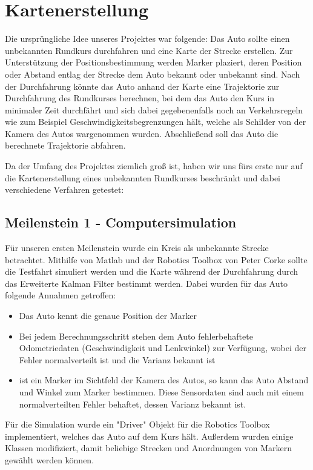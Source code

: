 \section{Kartenerstellung}

Die ursprüngliche Idee unseres Projektes war folgende: Das Auto sollte einen unbekannten Rundkurs durchfahren und eine Karte der Strecke erstellen. Zur Unterstützung der Positionsbestimmung werden Marker plaziert, deren Position oder Abstand entlag der Strecke dem Auto bekannt oder unbekannt sind.
Nach der Durchfahrung könnte das Auto anhand der Karte eine Trajektorie zur Durchfahrung des Rundkurses berechnen, bei dem das Auto den Kurs in minimaler Zeit durchfährt und sich dabei gegebenenfalls noch an Verkehrsregeln wie zum Beispiel Geschwindigkeitsbegrenzungen hält, welche als Schilder von der Kamera des Autos wargenommen wurden.
Abschließend soll das Auto die berechnete Trajektorie abfahren.

Da der Umfang des Projektes ziemlich groß ist, haben wir uns fürs erste nur auf die Kartenerstellung eines unbekannten Rundkurses beschränkt und dabei verschiedene Verfahren getestet:

\subsection{Meilenstein 1 - Computersimulation}

Für unseren ersten Meilenstein wurde ein Kreis als unbekannte Strecke betrachtet. Mithilfe von Matlab und der Robotics Toolbox von Peter Corke sollte die Testfahrt simuliert werden und die Karte während der Durchfahrung durch das Erweiterte Kalman Filter bestimmt werden.
Dabei wurden für das Auto folgende Annahmen getroffen:
\begin{itemize}
 	\item Das Auto kennt die genaue Position der Marker
 	\item Bei jedem Berechnungsschritt stehen dem Auto fehlerbehaftete Odometriedaten (Geschwindigkeit und Lenkwinkel) zur Verfügung, wobei der Fehler normalverteilt ist und die Varianz bekannt ist
 	\item ist ein Marker im Sichtfeld der Kamera des Autos, so kann das Auto Abstand und Winkel zum Marker bestimmen. Diese Sensordaten sind auch mit einem normalverteilten Fehler behaftet, dessen Varianz bekannt ist.
\end{itemize}
Für die Simulation wurde ein "Driver" Objekt für die Robotics Toolbox implementiert, welches das Auto auf dem Kurs hält. Außerdem wurden einige Klassen modifiziert, damit beliebige Strecken und Anordnungen von Markern gewählt werden können.

